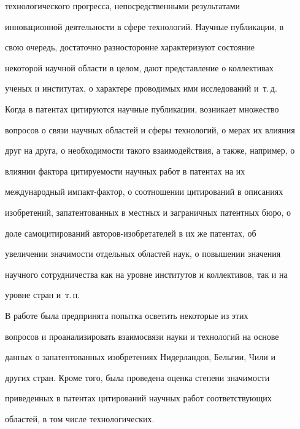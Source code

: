 технологического прогресса, непосредственными результатами 


инновационной деятельности в сфере технологий. Научные публикации, в 


свою очередь, достаточно разносторонне характеризуют состояние 


некоторой научной области в целом, дают представление о коллективах 


ученых и институтах, о характере проводимых ими исследований и~т.\,д. 


Когда в патентах цитируются научные публикации, возникает множество 


вопросов о связи научных областей и сферы технологий, о мерах их влияния 


друг на друга, о необходимости такого взаимодействия, а также, например, о 


влиянии фактора цитируемости научных работ в патентах на их 


международный им\-пакт-фак\-тор, о соотношении цитирований в описаниях 


изобретений, запатентованных в местных и заграничных патентных бюро, о 


доле самоцитирований авторов-изобретателей в их же патентах, об 


увеличении значимости отдельных областей наук, о повышении значения 


научного сотрудничества как на уровне институтов и коллективов, так и на 


уровне стран и~т.\,п. 


     


     В работе была предпринята попытка осветить некоторые из этих 


вопросов и проанализировать взаимосвязи науки и технологий на основе 


данных о запатентованных изобретениях Нидерландов, Бельгии, Чили и 


других стран. Кроме того, была проведена оценка степени значимости 


приведенных в патентах цитирований научных работ соответствующих 


областей, в том числе технологических. 





